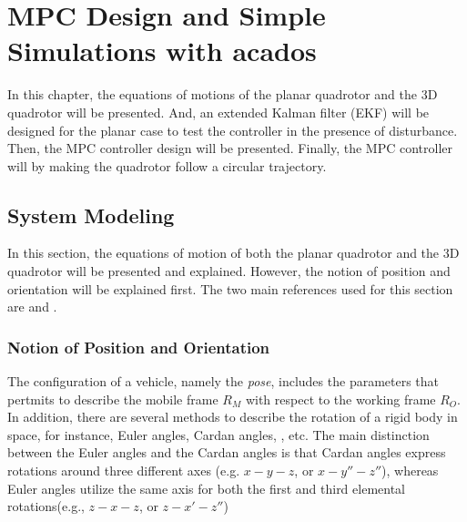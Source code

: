 \documentclass{thesisreport}
\begin{document}
 
\newpage 
 
%
 
\chapter{MPC Design and Simple Simulations with acados}
In this chapter, the equations of motions of the planar quadrotor and the 3D quadrotor will be presented. And, an extended Kalman filter (EKF) will be designed for the planar case to test the controller in the presence of disturbance. Then, the MPC controller design will be presented. Finally, the MPC controller will by making the quadrotor follow a circular trajectory.

\section{System Modeling} 
In this section, the equations of motion of both the planar quadrotor and the 3D quadrotor will be presented and explained. However, the notion of position and orientation will be explained first. The two main references used for this section are \cite{Fantoni2016} and \cite{Erskine2021}. 

\subsection{Notion of Position and Orientation}

The configuration of a vehicle, namely the \textit{pose}, includes the parameters that pertmits to describe the mobile frame $R_M$ with respect to the working frame $R_O$. In addition, there are several methods to describe the rotation of a rigid body in space, for instance, Euler angles, Cardan angles, \cite{Goldstein1980}, etc. The main distinction between the Euler angles and the Cardan angles is that Cardan angles express rotations around three different axes (e.g. $x-y-z$, or $x-y'' -z''$), whereas Euler angles utilize the same axis for both the first and third elemental rotations(e.g., $z-x-z$, or $z-x'-z''$)
\end{document}
